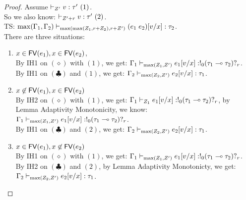 \begin{proof}
  
  Assume  $\empty \tvdash{\nnatA'} \valr : \type' ~(1) $.\\
  So we also know: $\empty \tvdash{\nnatA'+r} \valr : \type' ~(2)$. \\
   TS:   $\max (\Gamma_1, \Gamma_2 ) \vdash_{ \max(\max(
     Z_1,r+Z_2) , r+Z') } (e_1
   \; e_2)[v/x] : \tau_2$.\\
   There are three situations:
   \begin{enumerate}
   \item $x \in \mathsf{FV} (e_1), x \in \mathsf{FV} (e_2)$, \\
     By IH1 on $(\diamond)$ with $(1)$, we get: $ \Gamma_1
\vdash_{\max(Z_1, Z' )} e_1 [v/x]:  !_{0} ( \tau_1
\multimap \tau_2   ) ?_{r} $.\\
By IH1 on $(\clubsuit)$ and $(1)$, we get: $ \Gamma_2
\vdash_{\max(Z_2, Z')}
e_2 [v/x]: \tau_1  $.\\
\item $x \not\in \mathsf{FV} (e_1), x \in \mathsf{FV} (e_2)$\\
  By IH2 on $(\diamond)$ with $(1)$, we get: $ \Gamma_1
\vdash_{Z_1} e_1 [v/x]:  !_{0} ( \tau_1
\multimap \tau_2 )?_{r} $, by Lemma Adaptivity Monotonicity, we know: $\Gamma_1
\vdash_{\max(Z_1, Z' )} e_1 [v/x]:  !_{0} ( \tau_1
\multimap \tau_2 )?_{r} $.\\
By IH1 on $(\clubsuit)$ and $(2)$, we get: $ \Gamma_2
\vdash_{\max(Z_2, Z')}
e_2 [v/x]: \tau_1  $.\\
\item $x \in \mathsf{FV} (e_1), x \not\in \mathsf{FV} (e_2)$\\
  By IH1 on $(\diamond)$ with $(1)$, we get: $ \Gamma_1
\vdash_{\max(Z_1, Z' )} e_1 [v/x]:  !_{0} ( \tau_1
\multimap \tau_2   )?_{r}  $.\\
By IH2 on $(\clubsuit)$ and $(2)$, by Lemma Adaptivity Monotonicty, we get: $ \Gamma_2
\vdash_{\max(Z_2, Z')}
e_2 [v/x]: \tau_1  $.\\
     \end{enumerate}
   

\end{proof}
